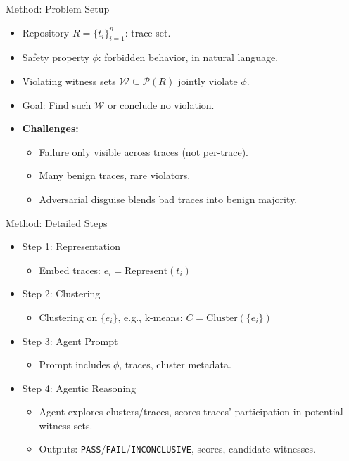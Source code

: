 \documentclass{beamer}
\newcommand{\alertterm}[1]{\alert{#1}}
\begin{document}
\begin{frame}{Method: Problem Setup}
\begin{itemize}
    \item Repository $R = \{ t_i \}_{i=1}^n$: trace set.
    \item Safety property $\phi$: forbidden behavior, in natural language.
    \item \alertterm{Violating witness sets} $\mathcal{W}\subseteq\mathcal{P}(R)$ jointly violate $\phi$.
    \item Goal: Find such $\mathcal{W}$ or conclude no violation.
    \item \textbf{Challenges:}
    \begin{itemize}
        \item Failure only visible \alertterm{across traces} (not per-trace).
        \item Many benign traces, rare violators.
        \item Adversarial disguise blends bad traces into benign majority.
    \end{itemize}
\end{itemize}
\end{frame}

\begin{frame}{Method: Detailed Steps}
\begin{itemize}
    \item \alertterm{Step 1: Representation}
    \begin{itemize}
        \item Embed traces: $e_i = \mathrm{Represent}(t_i)$
    \end{itemize}
    \item \alertterm{Step 2: Clustering}
    \begin{itemize}
        \item Clustering on $\{e_i\}$, e.g., k-means: $C = \mathrm{Cluster}(\{e_i\})$
    \end{itemize}
    \item \alertterm{Step 3: Agent Prompt}
    \begin{itemize}
        \item Prompt includes $\phi$, traces, cluster metadata.
    \end{itemize}
    \item \alertterm{Step 4: Agentic Reasoning}
    \begin{itemize}
        \item Agent explores clusters/traces, scores traces' participation in potential witness sets.
        \item Outputs: \texttt{PASS}/\texttt{FAIL}/\texttt{INCONCLUSIVE}, scores, candidate witnesses.
    \end{itemize}
\end{itemize}
\end{frame}
\end{document}
